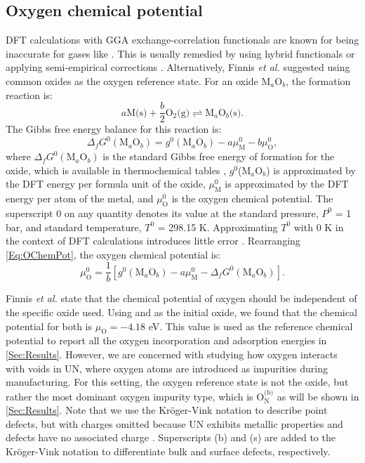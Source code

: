 \documentclass[preprint,12pt,sort&compress]{elsarticle}
\newcommand{\?}{\stackrel{?}{=}}
\begin{document}
\subsection{Oxygen chemical potential}
\label{Sec:uO}

DFT calculations with GGA exchange-correlation functionals are known for being inaccurate for gases like  \cite{Bocharov2013}. This is usually remedied by using hybrid functionals or applying semi-empirical corrections \cite{Sargeant2021}. Alternatively, Finnis \textit{et al.} \cite{Finnis2005} suggested using common oxides as the oxygen reference state. For an oxide M$_a$O$_b$, the formation reaction is:
\begin{equation}
a \text{M(s)} + \frac{b}{2} \text{O$_2$(g)} \rightleftharpoons \text{M$_a$O$_b$(s)}.
\end{equation}
The Gibbs free energy balance for this reaction is:
\begin{equation}
\Delta_f G^0 (\text{M$_a$O$_b$}) = g^0(\text{M$_a$O$_b$}) - a \mu_\text{M}^0 - b \mu_\text{O}^0,
\label{Eq:OChemPot}
\end{equation}
where $\Delta_f G^0 (\text{M$_a$O$_b$})$ is the standard Gibbs free energy of formation for the oxide, which is available in thermochemical tables \cite{Linstrom2024}, $g^0$(M$_a$O$_b$) is approximated by the DFT energy per formula unit of the oxide, $\mu_\text{M}^0$ is approximated by the DFT energy per atom of the metal, and $\mu_\text{O}^0$ is the oxygen chemical potential. The superscript 0 on any quantity denotes its value at the standard pressure, $P^0$ = 1 bar, and standard temperature, $T^0$ = 298.15 K. Approximating $T^0$ with 0 K in the context of DFT calculations introduces little error \cite{Finnis2005}. Rearranging \cref{Eq:OChemPot}, the oxygen chemical potential is:
\begin{equation}
\mu_\text{O}^0 = \frac{1}{b} \left[ g^0(\text{M$_a$O$_b$}) - a \mu_\text{M}^0 - \Delta_f G^0 (\text{M$_a$O$_b$}) \right].
\label{Eq:OxidePot}
\end{equation}

Finnis \textit{et al.} state that the chemical potential of oxygen should be independent of the specific oxide used. Using  and  as the initial oxide, we found that the chemical potential for both is $\mu_\text{O} = - 4.18$ eV. This value is used as the reference chemical potential to report all the oxygen incorporation and adsorption energies in \cref{Sec:Results}. However, we are concerned with studying how oxygen interacts with voids in UN, where oxygen atoms are introduced as impurities during manufacturing. For this setting, the oxygen reference state is not the oxide, but rather the most dominant oxygen impurity type, which is $\text{O}_\text{N}^\text{(b)}$ as will be shown in \cref{Sec:Results}. Note that we use the Kröger-Vink notation \cite{Kroger1956} to describe point defects, but with charges omitted because UN exhibits metallic properties and defects have no associated charge \cite{Cooper2023}. Superscripts (b) and (s) are added to the Kröger-Vink notation to differentiate bulk and surface defects, respectively.
\end{document}
